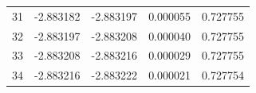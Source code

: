 \begin{tabular}{lrrrr}
31 & -2.883182 & -2.883197 & 0.000055 & 0.727755 \\
32 & -2.883197 & -2.883208 & 0.000040 & 0.727755 \\
33 & -2.883208 & -2.883216 & 0.000029 & 0.727755 \\
34 & -2.883216 & -2.883222 & 0.000021 & 0.727754 \\
\bottomrule
\end{tabular}
